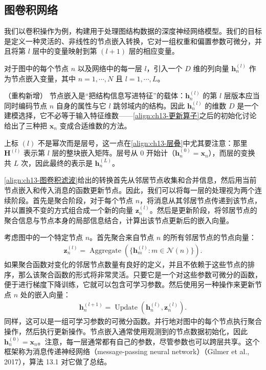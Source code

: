 \documentclass[../../main.tex]{subfiles}
\begin{document}
\subsection{图卷积网络}\label{subsection:ch13-图卷积网络}

我们以卷积操作为例，构建用于处理图结构数据的深度神经网络模型。我们的目标是定义一种灵活的、非线性的节点嵌入转换，它对一组权重和偏置参数可微分，并且将第 $l$ 层中的变量映射到第 $(l+1)$ 层的相应变量。

\begin{definition}[节点嵌入]\label{definition:ch13-节点嵌入}
对于图中的每个节点 $n$ 以及网络中的每一层 $l$，引入一个 $D$ 维的列向量 $\bm{h}_n^{(l)}$ 作为节点嵌入变量，其中 $n=1,\cdots,N$ 且 $l=1,\cdots,L$。
\end{definition}

\begin{remark}（重构新增）
节点嵌入是“把结构信息写进特征”的载体：$\bm{h}_n^{(l)}$ 的第 $l$ 层版本应当同时编码节点 $n$ 自身的属性与它 $l$ 跳邻域内的结构。因此 $\bm{h}_n^{(l)}$ 的维数 $D$ 是一个建模选择，它不必等于输入特征维数——\eqref{align:ch13-更新算子}之后的初始化讨论给出了三种把 $\bm{x}_n$ 变成合适维数的方法。\par
上标 $(l)$ 不是幂次而是层号，这一点在\eqref{align:ch13-层叠}中尤其要注意：那里 $\bm{H}^{(l)}$ 表示第 $l$ 层的整块嵌入矩阵。层号从 $0$ 开始计（$\bm{h}_n^{(0)}=\bm{x}_n$），而层的变换共 $L$ 次，因此最终的表示是 $\bm{h}_n^{(L)}$。
\end{remark}

\eqref{align:ch13-图卷积滤波}给出的转换首先从邻居节点收集和合并信息，然后用当前节点嵌入和传入消息的函数更新节点。因此，我们可以将每一层的处理视为两个连续阶段。首先是聚合阶段，对于每个节点 $n$，将消息从其邻居节点传递到该节点，并以置换不变的方式组合成一个新的向量 $\bm{z}_n^{(l)}$。然后是更新阶段，将邻居节点的聚合信息与节点本身的局部信息结合，计算出该节点更新后的嵌入向量。

\begin{definition}[消息传递神经网络]\label{definition:ch13-消息传递神经网络}
考虑图中的一个特定节点 $n$。首先聚合来自节点 $n$ 的所有邻居节点的节点向量：
\begin{align}
\bm{z}_n^{(l)}=\operatorname{Aggregate}\!\left(\{\bm{h}_m^{(l)}:m\in\mathcal{N}(n)\}\right).
\label{align:ch13-聚合定义}
\end{align}
如果聚合函数对变化的邻居节点数量有良好的定义，并且不依赖于这些节点的排序，那么该聚合函数的形式将非常灵活。只要它是一个对这些参数可微分的函数，便于进行梯度下降训练，它就可以包含可学习参数。然后使用另一种操作来更新节点 $n$ 处的嵌入向量：
\begin{align}
\bm{h}_n^{(l+1)}=\operatorname{Update}\!\left(\bm{h}_n^{(l)},\bm{z}_n^{(l)}\right).
\label{align:ch13-更新定义}
\end{align}
同样，这可以是一组可学习参数的可微分函数。并行地对图中的每个节点执行聚合操作，然后执行更新操作。节点嵌入通常使用观测到的节点数据初始化，因此 $\bm{h}_n^{(0)}=\bm{x}_n$。注意，每一层通常都有自己的参数，尽管参数也可以跨层共享。这个框架称为消息传递神经网络（message-passing neural network）（Gilmer et al., 2017），算法 13.1 对它做了总结。
\end{definition}
\end{document}
